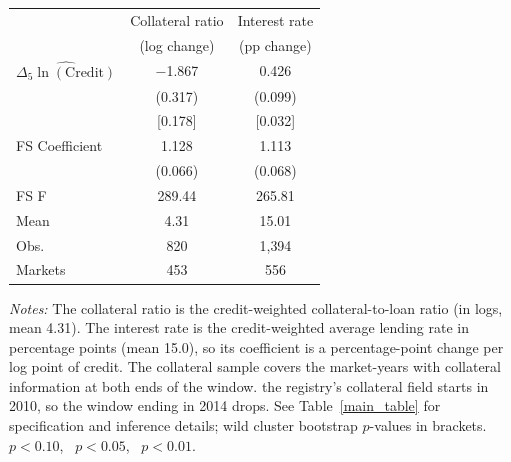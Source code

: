 \begin{threeparttable}
    \begin{tabular}{lcc}
        \toprule
        & Collateral ratio & Interest rate \\
        & (log change) & (pp change) \\
        \midrule
        $\widehat{\Delta_5\ln(\text{Credit})}$
        & $-$1.867\sym{***} & 0.426\sym{***} \\
        & (0.317) & (0.099) \\
        & [0.178] & [0.032] \\
        \midrule
        FS Coefficient & 1.128 & 1.113 \\
                       & (0.066) & (0.068) \\
        FS F & 289.44 & 265.81 \\
        Mean & 4.31 & 15.01 \\
        Obs. & 820 & 1{,}394 \\
        Markets & 453 & 556 \\
        \bottomrule
    \end{tabular}
    \begin{tablenotes}[flushleft]
        \footnotesize
        \item \textit{Notes:} The collateral ratio is the credit-weighted collateral-to-loan ratio (in logs, mean 4.31). The interest rate is the credit-weighted average lending rate in percentage points (mean 15.0), so its coefficient is a percentage-point change per log point of credit. The collateral sample covers the market-years with collateral information at both ends of the window. the registry's collateral field starts in 2010, so the window ending in 2014 drops. See Table~\ref{main_table} for specification and inference details; wild cluster bootstrap $p$-values in brackets. \sym{*}~$p<0.10$, \sym{**}~$p<0.05$, \sym{***}~$p<0.01$.
    \end{tablenotes}
\end{threeparttable}
